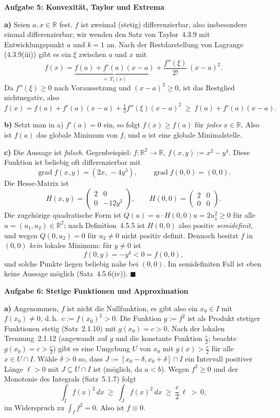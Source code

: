 \documentclass[a4paper,12pt]{article}
\providecommand{\qed}{\hfill\ensuremath{\blacksquare}}
\newcommand{\aufgabe}[2]{%
  \bigskip\par\noindent\textbf{Aufgabe #1: #2}\par\nobreak\medskip}
\begin{document}
\aufgabe{5}{Konvexität, Taylor und Extrema}

\textbf{a)} Seien $a,x\in\mathbb{R}$ fest. $f$ ist zweimal (stetig) differenzierbar, also insbesondere einmal differenzierbar; wir wenden den Satz von Taylor~4.3.9 mit Entwicklungspunkt $a$ und $k=1$ an. Nach der Restdarstellung von Lagrange (4.3.9(iii)) gibt es ein $\xi$ zwischen $a$ und $x$ mit
\[ f(x)=\underbrace{f(a)+f'(a)(x-a)}_{=\,T_1(x)}+\frac{f''(\xi)}{2!}\,(x-a)^2. \]
Da $f''(\xi)\ge 0$ nach Voraussetzung und $(x-a)^2\ge 0$, ist das Restglied nichtnegativ, also
\[ f(x)=f(a)+f'(a)(x-a)+\tfrac{1}{2}f''(\xi)(x-a)^2\ \ge\ f(a)+f'(a)(x-a). \]

\textbf{b)} Setzt man in a) $f'(a)=0$ ein, so folgt $f(x)\ge f(a)$ für \emph{jedes} $x\in\mathbb{R}$. Also ist $f(a)$ das globale Minimum von $f$, und $a$ ist eine globale Minimalstelle.

\textbf{c)} Die Aussage ist \emph{falsch}. Gegenbeispiel: $f:\mathbb{R}^2\to\mathbb{R}$, $f(x,y):=x^2-y^4$. Diese Funktion ist beliebig oft differenzierbar mit
\[ \operatorname{grad} f(x,y)=(2x,\,-4y^3),\qquad \operatorname{grad} f(0,0)=(0,0). \]
Die Hesse-Matrix ist
\[ H(x,y)=\begin{pmatrix} 2 & 0\\ 0 & -12y^2\end{pmatrix},\qquad
   H(0,0)=\begin{pmatrix} 2 & 0\\ 0 & 0\end{pmatrix}. \]
Die zugehörige quadratische Form ist $Q(u)=u\cdot H(0,0)u=2u_1^2\ge 0$ für alle $u=(u_1,u_2)\in\mathbb{R}^2$; nach Definition~4.5.5 ist $H(0,0)$ also positiv \emph{semidefinit}, und wegen $Q(0,u_2)=0$ für $u_2\neq 0$ nicht positiv definit. Dennoch besitzt $f$ in $(0,0)$ \emph{kein} lokales Minimum: für $y\neq 0$ ist
\[ f(0,y)=-y^4<0=f(0,0), \]
und solche Punkte liegen beliebig nahe bei $(0,0)$. Im semidefiniten Fall ist eben keine Aussage möglich (Satz~4.5.6(iv)). \qed

\aufgabe{6}{Stetige Funktionen und Approximation}

\textbf{a)} Angenommen, $f$ ist nicht die Nullfunktion, es gibt also ein $x_0\in I$ mit $f(x_0)\neq 0$, d.\,h.\ $c:=f(x_0)^2>0$. Die Funktion $g:=f^2$ ist als Produkt stetiger Funktionen stetig (Satz~2.1.10) mit $g(x_0)=c>0$. Nach der lokalen Trennung~2.1.12 (angewandt auf $g$ und die konstante Funktion $\tfrac{c}{2}$; beachte $g(x_0)=c>\tfrac{c}{2}$) gibt es eine Umgebung $U$ von $x_0$ mit $g(x)>\tfrac{c}{2}$ für alle $x\in U\cap I$. Wähle $\delta>0$ so, dass $J:=[x_0-\delta,x_0+\delta]\cap I$ ein Intervall positiver Länge $\ell>0$ mit $J\subseteq U\cap I$ ist (möglich, da $a<b$). Wegen $f^2\ge 0$ und der Monotonie des Integrals (Satz~5.1.7) folgt
\[ \int_I f(x)^2\,dx\ \ge\ \int_J f(x)^2\,dx\ \ge\ \frac{c}{2}\,\ell\ >\ 0, \]
im Widerspruch zu $\int_I f^2=0$. Also ist $f\equiv 0$.
\end{document}

